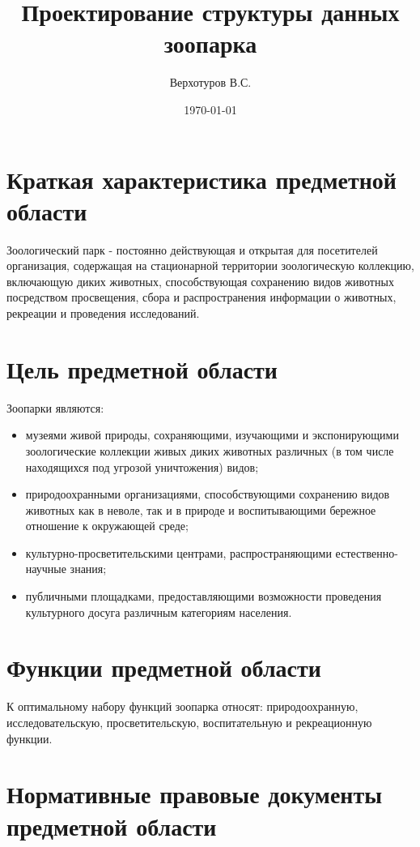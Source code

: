 \documentclass[12pt, a4paper, titlepage]{article}
\title{Проектирование структуры данных зоопарка}
\author{Верхотуров В.С.}
\affil{БСБО-05-20}
\affil{РТУ МИРЭА}
\date\today
\begin{document}
\maketitle

\section{Краткая характеристика предметной области}

Зоологический парк - постоянно действующая и открытая для посетителей организация, содержащая на стационарной территории зоологическую коллекцию, включающую диких животных, способствующая сохранению видов животных посредством просвещения, сбора и распространения информации о животных, рекреации и проведения исследований.


\section{Цель предметной области}

Зоопарки являются:
\begin{itemize}
    \item музеями живой природы, сохраняющими, изучающими и экспонирующими зоологические коллекции живых диких животных различных (в том числе находящихся под угрозой уничтожения) видов;
    
    \item природоохранными организациями, способствующими сохранению видов животных как в неволе, так и в природе и воспитывающими бережное отношение к окружающей среде;
    
    \item культурно-просветительскими центрами, распространяющими е\-сте\-стве\-нно-на\-уч\-ны\-е знания;
    
    \item публичными площадками, предоставляющими возможности проведения культурного досуга различным категориям населения.
\end{itemize}

\section{Функции предметной области}

К оптимальному набору функций зоопарка относят: природоохранную, исследовательскую, просветительскую, воспитательную и рекреационную функции.

\section{Нормативные правовые документы предметной области}
\end{document}
